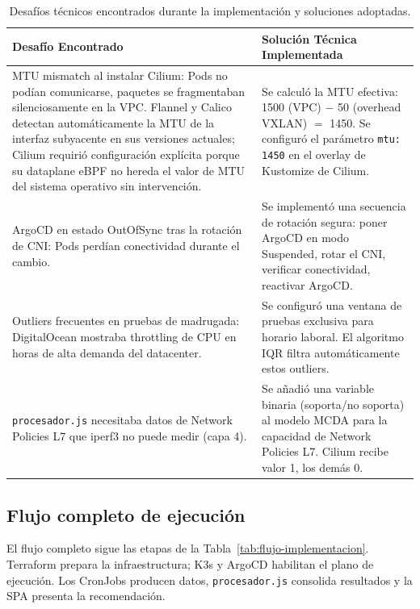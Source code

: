 \begin{table}[htbp]
\centering
\scriptsize
\renewcommand{\arraystretch}{1.25}
\setlength{\tabcolsep}{4pt}
\caption{Desafíos técnicos encontrados durante la implementación y soluciones adoptadas.}
\label{tab:desafios-implementacion}
\begin{tabularx}{\textwidth}{|Y|Y|}
\hline
\textbf{Desafío Encontrado} & \textbf{Solución Técnica Implementada} \\
\hline
MTU mismatch al instalar Cilium: Pods no podían comunicarse, paquetes se fragmentaban silenciosamente en la VPC. Flannel y Calico detectan automáticamente la MTU de la interfaz subyacente en sus versiones actuales; Cilium requirió configuración explícita porque su dataplane eBPF no hereda el valor de MTU del sistema operativo sin intervención. & Se calculó la MTU efectiva: 1500 (VPC) $-$ 50 (overhead VXLAN) $=$ 1450. Se configuró el parámetro \texttt{mtu: 1450} en el overlay de Kustomize de Cilium. \\
\hline
ArgoCD en estado OutOfSync tras la rotación de CNI: Pods perdían conectividad durante el cambio. & Se implementó una secuencia de rotación segura: poner ArgoCD en modo Suspended, rotar el CNI, verificar conectividad, reactivar ArgoCD. \\
\hline
Outliers frecuentes en pruebas de madrugada: DigitalOcean mostraba throttling de CPU en horas de alta demanda del datacenter. & Se configuró una ventana de pruebas exclusiva para horario laboral. El algoritmo IQR filtra automáticamente estos outliers. \\
\hline
\texttt{procesador.js} necesitaba datos de Network Policies L7 que iperf3 no puede medir (capa 4). & Se añadió una variable binaria (soporta/no soporta) al modelo MCDA para la capacidad de Network Policies L7. Cilium recibe valor 1, los demás 0. \\
\hline
\end{tabularx}
\end{table}

\subsection{Flujo completo de ejecución}

El flujo completo sigue las etapas de la Tabla~\ref{tab:flujo-implementacion}. Terraform prepara la infraestructura; K3s y ArgoCD habilitan el plano de ejecución. Los CronJobs producen datos, \texttt{procesador.js} consolida resultados y la SPA presenta la recomendación.

